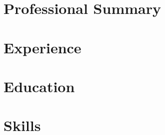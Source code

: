 \documentclass{article}
\begin{document}
\section*{Professional Summary}

\section*{Experience}

\section*{Education}

\section*{Skills}
\end{document}
